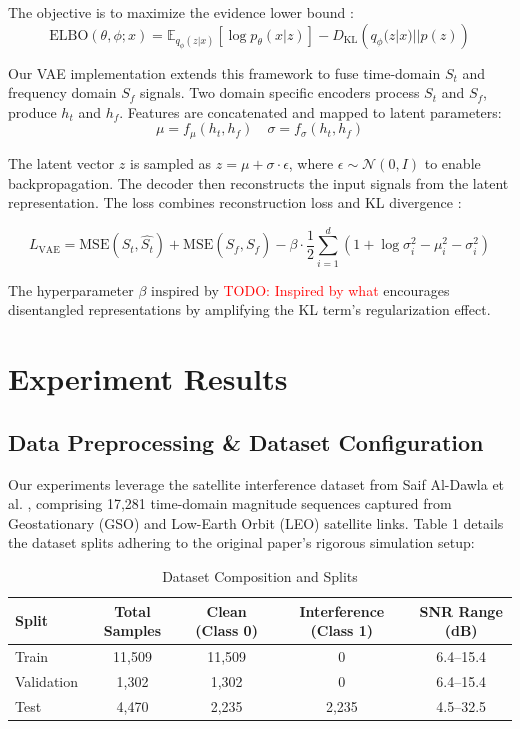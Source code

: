 \documentclass[12pt]{article}
\newcommand{\todo}[1]{\textcolor{red}{TODO: #1}}
\begin{document}
The objective is to maximize the evidence lower bound :
$$
    \text{ELBO}(\theta,\phi;x) = \mathbb{E}_{q_{\phi}(z|x)} \left[ \log p_{\theta}(x|z) \right] -  D_{\text{KL}} \left( q_{\phi}(z|x) || p(z) \right)
$$

Our VAE implementation extends this framework to fuse time-domain $S_t  $ and frequency domain $S_f$ signals. Two domain specific encoders process $S_t$ and $S_f$, produce $h_t$ and $h_f$. Features are concatenated and mapped to latent parameters:
$$
    \mu = f_{\mu}(h_t , h_f) \quad \sigma = f_{\sigma}(h_t , h_f)
$$

The latent vector $z$ is sampled as $z = \mu + \sigma \cdot \epsilon$, where $\epsilon \sim \mathcal{N}(0, I)$ to enable backpropagation. The decoder then reconstructs the input signals from the latent representation. The loss combines reconstruction loss and KL divergence :

$$
    L_{\text{VAE}} = \text{MSE}(S_t, \hat{S_t})+ \text{MSE}(S_f, \hat{S_f}) - \beta \cdot \frac{1}{2} \sum_{i=1}^{d }(1 + \log \sigma_{i}^{2} - \mu_i^{2} - \sigma_i^{2})
$$

The hyperparameter $\beta$ inspired by \todo{Inspired by what } encourages disentangled representations by amplifying the KL term’s regularization effect.

\section{Experiment Results}

\subsection{Data Preprocessing \& Dataset Configuration}

Our experiments leverage the satellite interference dataset from Saif Al-Dawla et al. \cite{saifaldawlaNGSOToGSOSatelliteInterference2023}, comprising 17,281 time-domain magnitude sequences captured from Geostationary (GSO) and Low-Earth Orbit (LEO) satellite links. Table 1 details the dataset splits adhering to the original paper's rigorous simulation setup:

\begin{table}[htbp]
\centering
\caption{Dataset Composition and Splits \cite{saifaldawlaNGSOToGSOSatelliteInterference2023}}
\label{tab:dataset}
\begin{tabular}{lcccc}
\toprule
\textbf{Split} & \textbf{Total Samples} & \textbf{Clean (Class 0)} & \textbf{Interference (Class 1)} & \textbf{SNR Range (dB)} \\
\midrule
Train          & 11,509                 & 11,509                   & 0                                & 6.4--15.4               \\
Validation     & 1,302                  & 1,302                    & 0                                & 6.4--15.4               \\
Test           & 4,470                  & 2,235                    & 2,235                            & 4.5--32.5               \\
\bottomrule
\end{tabular}
\end{table}
\end{document}
